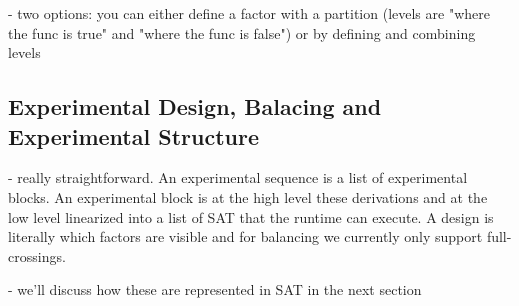 - two options: you can either define a factor with a partition (levels are "where the func is true" and "where the func is false") or by defining and combining levels

\subsection{Experimental Design, Balacing and Experimental Structure}

- really straightforward. An experimental sequence is a list of experimental blocks. An experimental block is at the high level these derivations and at the low level linearized into a list of SAT that the runtime can execute. A design is literally which factors are visible and for balancing we currently only support full-crossings.

- we'll discuss how these are represented in SAT in the next section
